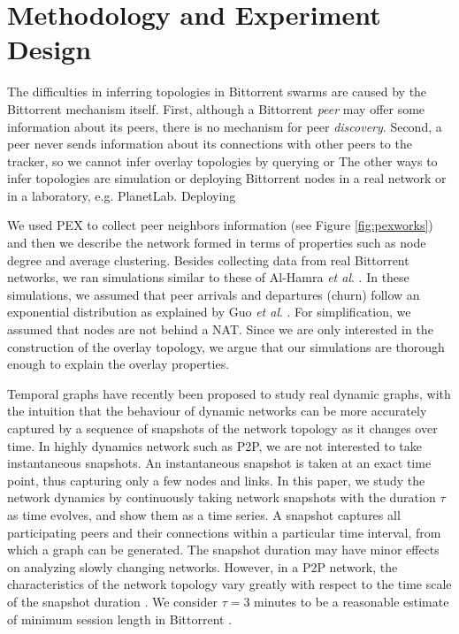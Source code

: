 \documentclass[paper]{ieice}
\begin{document}
\section{Methodology and Experiment Design}\label{methodanddesign}
The difficulties in inferring topologies in Bittorrent swarms are caused by the Bittorrent mechanism itself. 
First, although a Bittorrent \textit{peer} may offer some information about its peers, there is no mechanism for peer \textit{discovery}.  
Second, a peer never sends information about its connections with other peers to the tracker, so we cannot infer overlay topologies by querying or %
The other ways to infer topologies are simulation or deploying Bittorrent nodes in a real network or in a laboratory, e.g. PlanetLab. Deploying %

We used PEX to collect peer neighbors information  (see Figure \ref{fig:pexworks}) and then we describe the network formed in terms of properties such as node degree and average clustering. 
Besides collecting data from real Bittorrent networks, we ran simulations similar to these of Al-Hamra \textit{et al}. \cite{al2009swarming}. 
In these simulations, we assumed that peer arrivals and departures (churn) follow an exponential distribution as explained by Guo \textit{et al}. \cite{guo2005measurements}. 
For simplification, we assumed that nodes are not behind a NAT.
Since we are only interested in the construction of the overlay topology, we argue that our simulations are thorough enough to explain the overlay properties.

Temporal graphs have recently been proposed to study real dynamic graphs, with the intuition that the behaviour of dynamic networks can be more accurately captured by a sequence of snapshots of the network topology as it changes over time.
In highly dynamics network such as P2P, we are not interested to take instantaneous snapshots. 
An instantaneous snapshot is taken at an exact time point, thus capturing only a few nodes and links.
In this paper, we study the network dynamics by continuously taking network snapshots with the duration $\tau$ as time evolves, and show them as a time series.
A snapshot captures all participating peers and their connections within a particular time interval, from which a graph can be generated.
The snapshot duration may have minor effects on analyzing slowly changing networks.
However, in a P2P network, the characteristics of the network topology vary greatly with respect to the time scale of the snapshot duration \cite{stutzbach2008characterizing}.
We consider $\tau=3 $ minutes to be a reasonable estimate of minimum session length in Bittorrent \cite{stutzbach2006understanding}. 
\end{document}

